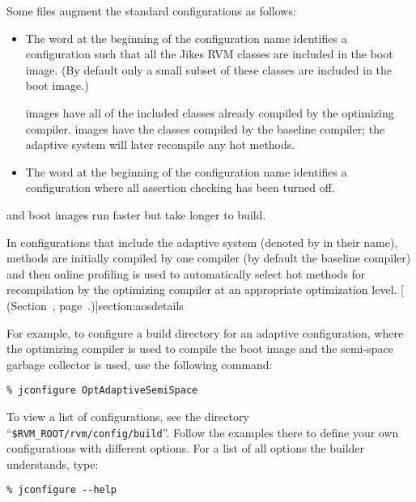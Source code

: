 Some files augment the standard configurations as follows:

\begin{itemize}

\item The word 
 at the beginning of the configuration name identifies a
configuration such that all the Jikes RVM classes are included in the
boot image.  (By default 
only a small subset of these classes are included in the boot image.)

 images 
have all of the included classes already compiled by the optimizing
compiler.   images have the classes compiled
by the baseline compiler; the adaptive system will later recompile any
hot methods.

\item The word  at the beginning of 
the configuration name identifies a  configuration where
all assertion checking has been turned off.

\end{itemize}

 and  boot images run faster but take
longer to build.

%
In configurations that include the adaptive system (denoted by
 in their name), methods are initially compiled by one
compiler (by default the baseline compiler) and then online profiling
is used to automatically select hot methods for recompilation by the
optimizing compiler at an appropriate optimization level.  [ (Section~\Ref, page~\Pageref.)]{section:aosdetails}

For example, to configure a build directory for an adaptive
configuration, where the optimizing compiler is used to compile the
boot image and the semi-space garbage collector is used, use the
following command:

\begin{verbatim}
% jconfigure OptAdaptiveSemiSpace
\end{verbatim}

To view a list of configurations, see the directory
``\texttt{\$RVM\_\-ROOT\-/\-rvm\-/\-con\-fig\-/\-build}''.  Follow the
examples there to define your own configurations with different options. 
For a list of all options the builder understands, type:
\begin{verbatim}
% jconfigure --help
\end{verbatim}

